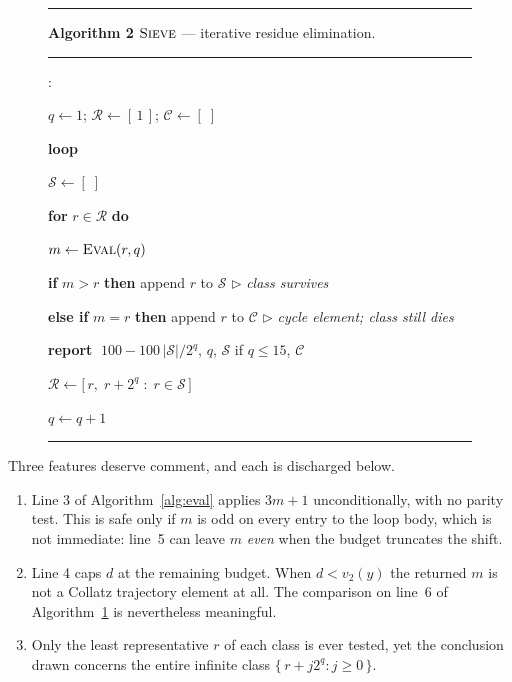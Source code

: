 \documentclass[11pt,a4paper]{article}
\theoremstyle{plain}
\theoremstyle{definition}
\newcounter{algline}
\newenvironment{pseudocode}
  {\begin{list}{\footnotesize\sffamily\arabic{algline}:}%
     {\usecounter{algline}%
      \setlength{\leftmargin}{2.4em}\setlength{\labelwidth}{1.6em}%
      \setlength{\labelsep}{0.8em}\setlength{\itemsep}{1pt}%
      \setlength{\parsep}{0pt}\setlength{\topsep}{4pt}}}
  {\end{list}}
\newcommand{\kw}[1]{\textbf{#1}}
\newcommand{\ind}{\hspace*{1.4em}}
\newcommand{\indd}{\hspace*{2.8em}}
\newcommand{\comm}[1]{{\color{gray}\(\triangleright\) \textit{#1}}}
\newcommand{\vtwo}{v_2}
\newcommand{\Rlev}{\mathcal{R}}
\newcommand{\Slev}{\mathcal{S}}
\begin{document}
\begin{figure}[htb]
\hrule\vspace{4pt}
\noindent\textbf{Algorithm 2}\; $\textsc{Sieve}$ --- iterative residue
elimination.
\vspace{2pt}\hrule
\begin{pseudocode}
\item $q \gets 1$; \quad $\Rlev \gets [\,1\,]$; \quad $\mathcal{C} \gets [\;]$
\item \kw{loop}
\item \ind $\Slev \gets [\;]$
\item \ind \kw{for} $r \in \Rlev$ \kw{do}
\item \indd $m \gets \textsc{Eval}(r, q)$
\item \indd \kw{if} $m > r$ \kw{then} append $r$ to $\Slev$
        \hfill \comm{class survives}
\item \indd \kw{else if} $m = r$ \kw{then} append $r$ to $\mathcal{C}$
        \hfill \comm{cycle element; class still dies}
\item \ind \kw{report} $\;100 - 100\,|\Slev| / 2^{q}$, \; $q$, \;
        $\Slev$ if $q \leq 15$, \; $\mathcal{C}$
\item \ind $\Rlev \gets \bigl[\, r,\; r + 2^{q} \;:\; r \in \Slev \,\bigr]$
\item \ind $q \gets q + 1$
\end{pseudocode}
\hrule
\caption{}
\label{alg:sieve}
\end{figure}

Three features deserve comment, and each is discharged below.

\begin{enumerate}\itemsep3pt
\item[(P1)] Line 3 of Algorithm~\ref{alg:eval} applies $3m+1$
      unconditionally, with no parity test. This is safe only if $m$ is odd on
      every entry to the loop body, which is not immediate: line~5 can leave
      $m$ \emph{even} when the budget truncates the shift.
\item[(P2)] Line 4 caps $d$ at the remaining budget. When
      $d < \vtwo(y)$ the returned $m$ is not a Collatz trajectory element at
      all. The comparison on line~6 of Algorithm~\ref{alg:sieve} is
      nevertheless meaningful.
\item[(P3)] Only the least representative $r$ of each class is ever tested,
      yet the conclusion drawn concerns the entire infinite class
      $\{\, r + j 2^{q} : j \geq 0 \,\}$.
\end{enumerate}
\end{document}
